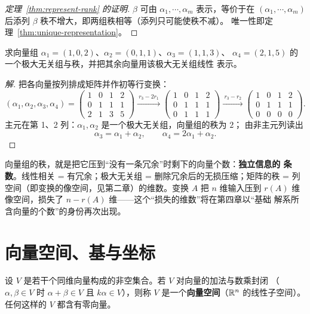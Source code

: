 \begin{proof}[定理~\ref{thm:represent-rank} 的证明]
$\beta$ 可由 $\alpha_1,\cdots,\alpha_m$ 表示，等价于在 $(\alpha_1,\cdots,
\alpha_m)$ 后添列 $\beta$ 秩不增大，即两组秩相等（添列只可能使秩不减）。
唯一性即定理~\ref{thm:unique-representation}。
\end{proof}

\begin{example}
求向量组 $\alpha_1=(1,0,2)$、$\alpha_2=(0,1,1)$、$\alpha_3=(1,1,3)$、
$\alpha_4=(2,1,5)$ 的一个极大无关组与秩，并把其余向量用该极大无关组线性
表示。
\end{example}
\begin{proof}[解]
把各向量按列排成矩阵并作初等行变换：
\[
  (\alpha_1,\alpha_2,\alpha_3,\alpha_4)=
  \begin{pmatrix} 1 & 0 & 1 & 2 \\ 0 & 1 & 1 & 1 \\ 2 & 1 & 3 & 5 \end{pmatrix}
  \xrightarrow{\ r_3-2r_1\ }
  \begin{pmatrix} 1 & 0 & 1 & 2 \\ 0 & 1 & 1 & 1 \\ 0 & 1 & 1 & 1 \end{pmatrix}
  \xrightarrow{\ r_3-r_2\ }
  \begin{pmatrix} 1 & 0 & 1 & 2 \\ 0 & 1 & 1 & 1 \\ 0 & 0 & 0 & 0 \end{pmatrix}.
\]
主元在第 1、2 列：$\alpha_1,\alpha_2$ 是一个极大无关组，向量组的秩为 $2$；
由非主元列读出
\[
  \alpha_3=\alpha_1+\alpha_2,\qquad \alpha_4=2\alpha_1+\alpha_2 .
\]
\end{proof}

\begin{insight}[本质：秩 = 独立信息的条数]
向量组的秩，就是把它压到“没有一条冗余”时剩下的向量个数：\textbf{独立信息的
条数}。线性相关 = 有冗余；极大无关组 = 删除冗余后的无损压缩；矩阵的秩 =
列空间（即变换的像空间，见第二章）的维数。变换 $A$ 把 $n$ 维输入压到
$r(A)$ 维像空间，损失了 $n-r(A)$ 维——这个“损失的维数”将在第四章以“基础
解系所含向量的个数”的身份再次出现。
\end{insight}

\section{向量空间、基与坐标}

\begin{definition}\label{def:vector-space}
设 $V$ 是若干个同维向量构成的非空集合。若 $V$ 对向量的加法与数乘封闭
（$\alpha,\beta\in V$ 时 $\alpha+\beta\in V$ 且 $k\alpha\in V$），则称 $V$
是一个\textbf{向量空间}（$\mathbb{R}^n$ 的线性子空间）。任何这样的 $V$ 都含有零向量。
\end{definition}

